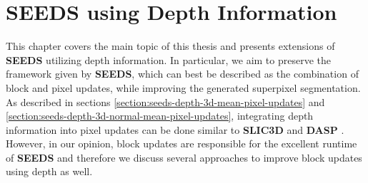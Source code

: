 \chapter{SEEDS using Depth Information}
\label{chapter:seeds-depth}

This chapter covers the main topic of this thesis and presents extensions of \textbf{SEEDS} \cite{VanDenBerghBoixRoigCapitaniVanGool:2012} utilizing depth information. In particular, we aim to preserve the framework given by \textbf{SEEDS}, which can best be described as the combination of block and pixel updates, while improving the generated superpixel segmentation. As described in sections \ref{section:seeds-depth-3d-mean-pixel-updates} and \ref{section:seeds-depth-3d-normal-mean-pixel-updates}, integrating depth information into pixel updates can be done similar to \textbf{SLIC3D} and \textbf{DASP} \cite{WeikersdorferGossowBeetz:2012}. However, in our opinion, block updates are responsible for the excellent runtime of \textbf{SEEDS} and therefore we discuss several approaches to improve block updates using depth as well.



